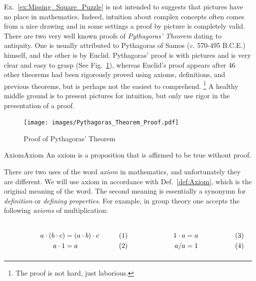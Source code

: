         Ex.~\ref{ex:Missing_Square_Puzzle} is not intended to suggests that
        pictures have no place in mathematics. Indeed, intuition about complex
        concepts often comes from a nice drawing and in some settings a proof by
        picture is completely valid. There are two very well known proofs of
        \textit{Pythagoras' Theorem}%
         dating to antiquity. One is usually
        attributed to Pythagoras of Samos (\textit{c.} 570-495 B.C.E.) himself,
        and the other is by Euclid. Pythagoras' proof is with pictures and is
        very clear and easy to grasp
        (See Fig.~\ref{fig:Proof_Pythagoras_Theorem}), whereas Euclid's proof
        appears after 46 other theorems had been rigorously proved using
        axioms, definitions, and previous theorems, but is perhaps not the
        easiest to comprehend.%
        \footnote{%
            The proof is not hard, just laborious.
        }
        A healthy middle ground is to present pictures for intuition, but only
        use rigor in the presentation of a proof.
        \begin{figure}[H]
            \centering
            \captionsetup{type=figure}
            \texttt{[image: images/Pythagoras\_Theorem\_Proof.pdf]}
            \caption{Proof of Pythagoras' Theorem}
            \label{fig:Proof_Pythagoras_Theorem}
        \end{figure}
        \begin{fdefinition}{Axiom}{Axiom}
            An \gls{axiom} is a \gls{proposition} that is affirmed to be true
            without \gls{proof}.
        \end{fdefinition}
        There are two uses of the word \textit{axiom} in mathematics, and
        unfortunately they are different. We will use axiom in accordance with
        Def.~\ref{def:Axiom}, which is the original meaning of the word. The
        second meaning is essentially a synonymn for \textit{definition} or
        \textit{defining properties}. For example, in group theory one accepts
        the following \textit{axioms} of multiplication:
        \par
        \begin{subequations}
            \begin{minipage}[b]{0.49\textwidth}
                \begin{align}
                    a\cdot(b\cdot{c})&=(a\cdot{b})\cdot{c}\\
                    a\cdot{1}&=a
                \end{align}
            \end{minipage}
            \hfill
            \begin{minipage}[b]{0.49\textwidth}
                \begin{align}
                    1\cdot{a}&=a\\
                    a/a&=1
                \end{align}
            \end{minipage}
        \end{subequations}
